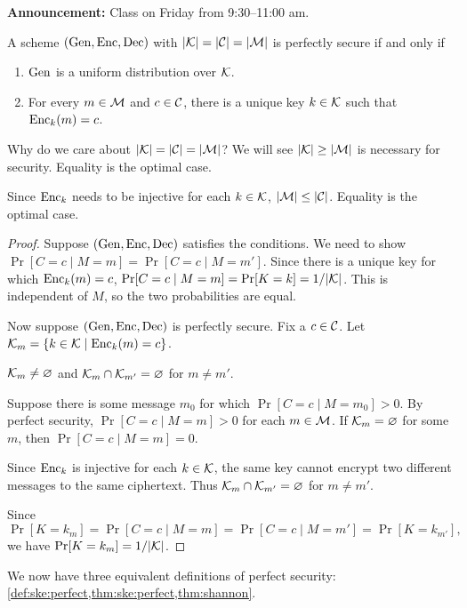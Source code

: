 \textbf{Announcement:} Class on Friday from 9:30--11:00 am.

\begin{theorem*} \label{thm:shannon}
    A scheme $(\operatorname{Gen}, \operatorname{Enc}, \operatorname{Dec})$ with
    $\lvert\mathcal{K}\rvert = \lvert\mathcal{C}\rvert = \lvert\mathcal{M}\rvert$ is perfectly secure
    if and only if
    \begin{enumerate}
        \item $\operatorname{Gen}$ is a uniform distribution over $\mathcal{K}$.
        \item For every $m \in \mathcal{M}$ and $c \in \mathcal{C}$,
            there is a unique key $k \in \mathcal{K}$ such that
            $\operatorname{Enc}_k(m) = c$.
    \end{enumerate}
\end{theorem*}
Why do we care about $\lvert\mathcal{K}\rvert = \lvert\mathcal{C}\rvert = \lvert\mathcal{M}\rvert$?
We will see $\lvert\mathcal{K}\rvert \ge \lvert\mathcal{M}\rvert$ is necessary for security.
Equality is the optimal case.

Since $\operatorname{Enc}_k$ needs to be injective for each $k \in \mathcal{K}$,
$\lvert\mathcal{M}\rvert \le \lvert\mathcal{C}\rvert$.
Equality is the optimal case.

\begin{proof}
    Suppose $(\operatorname{Gen}, \operatorname{Enc}, \operatorname{Dec})$ satisfies the conditions.
    We need to show $\Pr[C = c \mid M = m] = \Pr[C = c \mid M = m']$.
    Since there is a unique key for which $\operatorname{Enc}_k(m) = c$,
    $\Pr[C = c \mid M = m] = \Pr[K = k] = 1/\lvert\mathcal{K}\rvert$.
    This is independent of $M$, so the two probabilities are equal.

    Now suppose $(\operatorname{Gen}, \operatorname{Enc}, \operatorname{Dec})$ is perfectly secure.
    Fix a $c \in \mathcal{C}$.
    Let $\mathcal{K}_m = \{k \in \mathcal{K} \mid \operatorname{Enc}_k(m) = c\}$.

    \begin{claim}
        $\mathcal{K}_m \ne \varnothing$ and $\mathcal{K}_m \cap \mathcal{K}_{m'} = \varnothing$ for $m \ne m'$.
    \end{claim}
    Suppose there is some message $m_0$ for which
    $\Pr[C = c \mid M = m_0] > 0$.
    By perfect security, $\Pr[C = c \mid M = m] > 0$ for each $m \in \mathcal{M}$.
    If $\mathcal{K}_m = \varnothing$ for some $m$, then $\Pr[C = c \mid M = m] = 0$.

    Since $\operatorname{Enc}_k$ is injective for each $k \in \mathcal{K}$,
    the same key cannot encrypt two different messages to the same
    ciphertext.
    Thus $\mathcal{K}_m \cap \mathcal{K}_{m'} = \varnothing$ for $m \ne m'$.

    Since \[
        \Pr[K = k_m] = \Pr[C = c \mid M = m] = \Pr[C = c \mid M = m']
        = \Pr[K = k_{m'}],
    \] we have $\Pr[K = k_m] = 1/\lvert\mathcal{K}\rvert$.
\end{proof}

We now have three equivalent definitions of perfect security:
\cref{def:ske:perfect,thm:ske:perfect,thm:shannon}.
